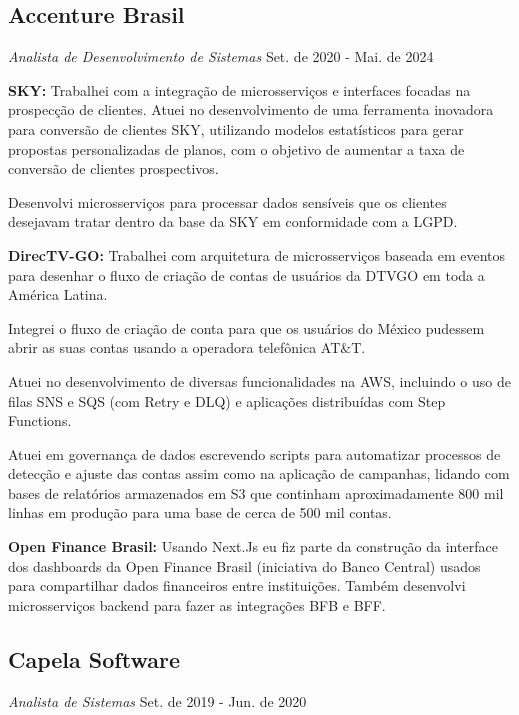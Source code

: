 \documentclass[a4paper,10pt]{article}
\begin{document}
\subsection*{Accenture Brasil}
\textcolor{corSubSection}{\emph{Analista de Desenvolvimento de Sistemas}}
\hfill \textcolor{corSubSection}{Set. de 2020 - Mai. de 2024}


\vspace{2mm} \textcolor{corSubSection}{\bfseries{SKY:}}
Trabalhei com a integração de microsserviços e interfaces
focadas na prospecção de clientes.
Atuei no desenvolvimento de uma ferramenta inovadora para conversão de clientes SKY,
utilizando modelos estatísticos para gerar propostas personalizadas de planos,
com o objetivo de aumentar a taxa de conversão de clientes prospectivos.

Desenvolvi microsserviços para processar dados sensíveis que os clientes
desejavam tratar dentro da base da SKY em conformidade com a LGPD.

\vspace{2mm} \textcolor{corSubSection}{\bfseries{DirecTV-GO:}}
Trabalhei com arquitetura de microsserviços baseada em eventos
para desenhar o fluxo de criação de contas de usuários
da DTVGO em toda a América Latina.

Integrei o fluxo de criação de conta para que os usuários do México
pudessem abrir as suas contas usando a operadora telefônica AT\&T.

Atuei no desenvolvimento de diversas funcionalidades na AWS,
incluindo o uso de filas SNS e SQS (com Retry e DLQ)
e aplicações distribuídas com Step Functions.

Atuei em governança de dados escrevendo scripts
para automatizar processos de detecção e ajuste das contas
assim como na aplicação de campanhas,
lidando com bases de relatórios armazenados em S3 que continham aproximadamente
800 mil linhas em produção para uma base de cerca de 500 mil contas.


\vspace{2mm} \textcolor{corSubSection}{\bfseries{Open Finance Brasil:}}
Usando Next.Js eu fiz parte da construção da interface dos dashboards
da Open Finance Brasil (iniciativa do Banco Central)
usados para compartilhar dados financeiros entre instituições.
Também desenvolvi microsserviços backend para fazer as integrações BFB e BFF.

\subsection*{Capela Software}
\textcolor{corSubSection}{\emph{Analista de Sistemas}}
\hfill\textcolor{corSubSection}{Set. de 2019 - Jun. de 2020}
\end{document}
